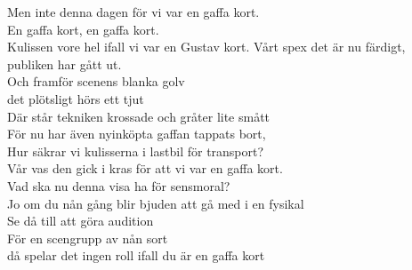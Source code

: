 \documentclass[a6paper,10pt]{article}
\begin{document}
Men inte denna dagen för vi var en gaffa kort.
\vspace{5pt}\\
En gaffa kort, en gaffa kort.\\
Kulissen vore hel ifall vi var en Gustav kort.
\setlength{\oddsidemargin}{-0.47in}
\noindent
Vårt spex det är nu färdigt, publiken har gått ut.\\
Och framför scenens blanka golv\\
det plötsligt hörs ett tjut\\
Där står tekniken krossade och gråter lite smått\\
För nu har även nyinköpta gaffan tappats bort,\\
Hur säkrar vi kulisserna i lastbil för transport?\\
Vår vas den gick i kras för att vi var en gaffa kort.
\vspace{5pt}\\
Vad ska nu denna visa ha för sensmoral?\\
Jo om du nån gång blir bjuden att gå med i en fysikal\\
Se då till att göra audition\\
För en scengrupp av nån sort\\
då spelar det ingen roll ifall du är en gaffa kort
\end{document}
